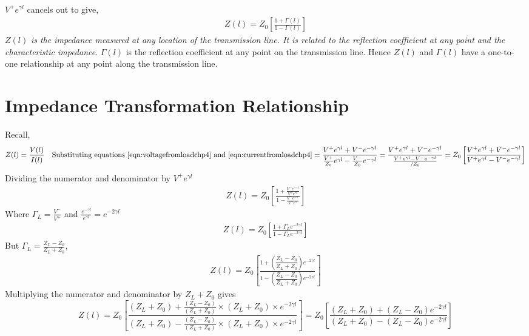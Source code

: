 \begin{align*}
\end{align*}
$V^+ e^{\gamma l}$ cancels out to give,
\begin{align}
Z(l) = Z_0\left[\frac{1 + \Gamma(l)}{1 - \Gamma(l)}\right]
\end{align}
$Z(l)$ \emph{is the impedance measured at any location of the transmission line. It is related to the reflection coefficient at any point and the characteristic impedance}. $\Gamma(l)$ is the reflection coefficient at any point on the transmission line. Hence $Z(l)$ and $\Gamma(l)$ have a one-to-one relationship at any point along the transmission line.

\section{Impedance Transformation Relationship}
Recall,
\begin{dmath*}
Z(l) = \frac{V(l)}{I(l)}\quad\text{Substituting equations~\eqref{eqn:voltagefromloadchp4} and~\eqref{eqn:currentfromloadchp4}}
= \frac{V^+e^{\gamma l} + V^-e^{-\gamma l}}{\frac{V^+}{Z_0}e^{\gamma l} - \frac{V^-}{Z_0}e^{-\gamma l}}
= \frac{V^+e^{\gamma l} + V^-e^{-\gamma l}}{\frac{V^+e^{\gamma l} - V^-e^{-\gamma l}}{/Z_0}}
= Z_0\left[\frac{V^+e^{\gamma l} + V^-e^{-\gamma l}}{V^+e^{\gamma l} - V^-e^{-\gamma l}}\right]
\end{dmath*}
Dividing the numerator and denominator by $V^+e^{\gamma l}$ 
\begin{align*}
Z(l) = Z_0\left[\frac{1 + \frac{V^-e^{-\gamma l}}{V^+e^{\gamma l}}}{1 - \frac{V^-e^{-\gamma }}{V^+e^{\gamma }}}\right]
\end{align*}
Where $\Gamma_L = \frac{V^-}{V^+}$ and $\frac{e^{-\gamma l}}{e^{\gamma l}} = e^{-2\gamma l}$
\begin{align}
Z(l)= Z_0\left[\frac{1 + \Gamma_L e^{-2\gamma l}}{1 - \Gamma_L e^{-2\gamma l}}\right]
\end{align}
But $\Gamma_L
= \frac{Z_L - Z_0}{Z_L + Z_0}$,
\begin{align*}
Z(l) = Z_0 \left[\frac{1 + \left(\dfrac{Z_L - Z_0}{Z_L + Z_0}\right)e^{-2\gamma l}}{1 - \left(\dfrac{Z_L - Z_0}{Z_L + Z_0}\right)e^{-2\gamma l}}\right]
\end{align*}
Multiplying the numerator and denominator by $Z_L + Z_0 $ gives
\begin{dmath*}
Z(l) = Z_0 \left[\frac{(Z_L + Z_0) + \frac{(Z_L - Z_0)}{(Z_L + Z_0)} \times (Z_L + Z_0) \times e^{-2\gamma l}}{(Z_L + Z_0) - \frac{(Z_L - Z_0)}{(Z_L + Z_0)} \times (Z_L + Z_0) \times e^{-2\gamma l}}\right]
= Z_0 \left[\frac{(Z_L + Z_0) + (Z_L - Z_0)e^{-2\gamma l}}{(Z_L + Z_0) - (Z_L - Z_0)e^{-2\gamma l}}\right]
\end{dmath*}
